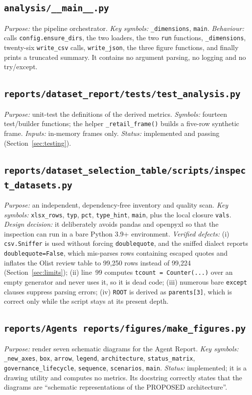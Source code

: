 \documentclass[11pt,a4paper]{article}
\newcommand{\code}[1]{\texttt{#1}}
\begin{document}
\subsection{\code{analysis/\_\_main\_\_.py}}
\textit{Purpose:} the pipeline orchestrator. \textit{Key symbols:} \code{\_dimensions}, \code{main}. \textit{Behaviour:} calls \code{config.ensure\_dirs}, the two loaders, the two \code{run} functions, \code{\_dimensions}, twenty-six \code{write\_csv} calls, \code{write\_json}, the three figure functions, and finally prints a truncated summary. It contains no argument parsing, no logging and no try/except.

\subsection{\code{reports/dataset\_report/tests/test\_analysis.py}}
\textit{Purpose:} unit-test the definitions of the derived metrics. \textit{Symbols:} fourteen test/builder functions; the helper \code{\_retail\_frame()} builds a five-row synthetic frame. \textit{Inputs:} in-memory frames only. \textit{Status:} implemented and passing (Section~\ref{sec:testing}).

\subsection{\code{reports/dataset\_selection\_table/scripts/inspect\_datasets.py}}
\textit{Purpose:} an independent, dependency-free inventory and quality scan. \textit{Key symbols:} \code{xlsx\_rows}, \code{typ}, \code{pct}, \code{type\_hint}, \code{main}, plus the local closure \code{vals}. \textit{Design decision:} it deliberately avoids pandas and openpyxl so that the inspection can run in a bare Python 3.9+ environment. \textit{Verified defects:} (i) \code{csv.Sniffer} is used without forcing \code{doublequote}, and the sniffed dialect reports \code{doublequote=False}, which mis-parses rows containing escaped quotes and inflates the Olist review table to 99{,}250 rows instead of 99{,}224 (Section~\ref{sec:limits}); (ii) line~99 computes \code{tcount = Counter(...)} over an empty generator and never uses it, so it is dead code; (iii) numerous bare \code{except} clauses suppress parsing errors; (iv) \code{ROOT} is derived as \code{parents[3]}, which is correct only while the script stays at its present depth.

\subsection{\code{reports/Agents reports/figures/make\_figures.py}}
\textit{Purpose:} render seven schematic diagrams for the Agent Report. \textit{Key symbols:} \code{\_new\_axes}, \code{box}, \code{arrow}, \code{legend}, \code{architecture}, \code{status\_matrix}, \code{governance\_lifecycle}, \code{sequence}, \code{scenarios}, \code{main}. \textit{Status:} implemented; it is a drawing utility and computes no metrics. Its docstring correctly states that the diagrams are ``schematic representations of the PROPOSED architecture''.
\end{document}
